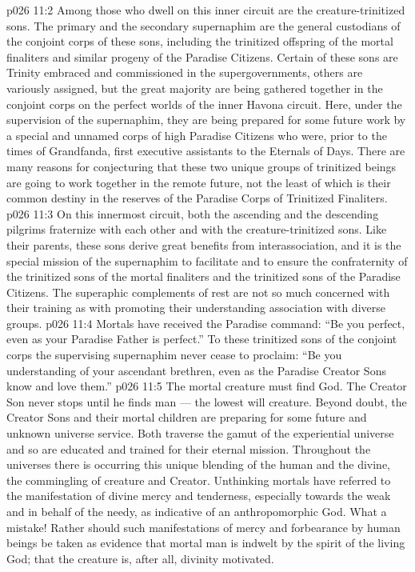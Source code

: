 \vs p026 11:2 \pc Among those who dwell on this inner circuit are the creature\hyp{}trinitized sons. The primary and the secondary supernaphim are the general custodians of the conjoint corps of these sons, including the trinitized offspring of the mortal finaliters and similar progeny of the Paradise Citizens. Certain of these sons are Trinity embraced and commissioned in the supergovernments, others are variously assigned, but the great majority are being gathered together in the conjoint corps on the perfect worlds of the inner Havona circuit. Here, under the supervision of the supernaphim, they are being prepared for some future work by a special and unnamed corps of high Paradise Citizens who were, prior to the times of Grandfanda, first executive assistants to the Eternals of Days. There are many reasons for conjecturing that these two unique groups of trinitized beings are going to work together in the remote future, not the least of which is their common destiny in the reserves of the Paradise Corps of Trinitized Finaliters.
\vs p026 11:3 On this innermost circuit, both the ascending and the descending pilgrims fraternize with each other and with the creature\hyp{}trinitized sons. Like their parents, these sons derive great benefits from interassociation, and it is the special mission of the supernaphim to facilitate and to ensure the confraternity of the trinitized sons of the mortal finaliters and the trinitized sons of the Paradise Citizens. The superaphic complements of rest are not so much concerned with their training as with promoting their understanding association with diverse groups.
\vs p026 11:4 Mortals have received the Paradise command: “Be you perfect, even as your Paradise Father is perfect.” To these trinitized sons of the conjoint corps the supervising supernaphim never cease to proclaim: “Be you understanding of your ascendant brethren, even as the Paradise Creator Sons know and love them.”
\vs p026 11:5 \pc The mortal creature must find God. The Creator Son never stops until he finds man --- the lowest will creature. Beyond doubt, the Creator Sons and their mortal children are preparing for some future and unknown universe service. Both traverse the gamut of the experiential universe and so are educated and trained for their eternal mission. Throughout the universes there is occurring this unique blending of the human and the divine, the commingling of creature and Creator. Unthinking mortals have referred to the manifestation of divine mercy and tenderness, especially towards the weak and in behalf of the needy, as indicative of an anthropomorphic God. What a mistake! Rather should such manifestations of mercy and forbearance by human beings be taken as evidence that mortal man is indwelt by the spirit of the living God; that the creature is, after all, divinity motivated.
